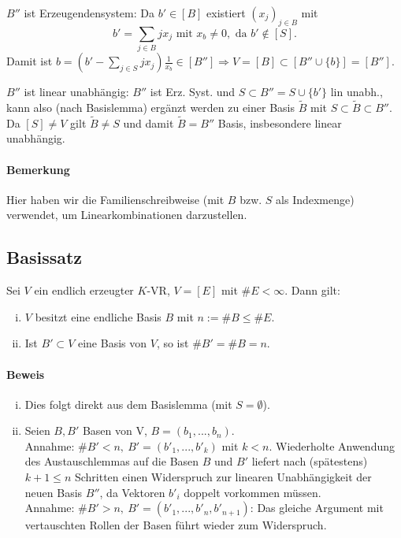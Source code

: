     $B''$ ist Erzeugendensystem: Da $b'\in [B]$ existiert $(x_j)_{j\in B}$ mit
    \[b' = \sum_{j\in B} jx_j \text{ mit } x_b \neq 0, \text{ da } b' \notin [S].\]
    Damit ist $b=(b'-\sum_{j\in S} jx_j)\frac{1}{x_b} \in [B''] \Rightarrow V = [B] \subset [B'' \cup \{b\}] =  [B'']$.
    
    $B''$ ist linear unabhängig: $B''$ ist Erz. Syst. und $S\subset B'' = S \cup \{b'\}$ lin unabh., kann also (nach Basislemma) ergänzt werden zu einer Basis $\tilde{B}$ mit $S\subset \tilde{B}\subset B''$.
    Da $[S] \neq V$ gilt $\tilde{B} \neq S$ und damit $\tilde{B} = B''$ Basis, insbesondere linear unabhängig.
    
\paragraph{Bemerkung}
    Hier haben wir die Familienschreibweise (mit $B$ bzw. $S$ als Indexmenge) verwendet, um Linearkombinationen darzustellen.
    
\subsection{Basissatz}
	\begin{Satz}[Basissatz]
	Sei $V$ ein endlich erzeugter $K$-VR, $V=[E]$ mit $\#E < \infty$. Dann gilt:
	\begin{enumerate}[(i)]
		\item $V$ besitzt eine endliche Basis $B$ mit $n:= \#B \leq \#E$.
		\item Ist $B'\subset V$ eine Basis von $V$, so ist $\#B' = \#B = n$.
	\end{enumerate}
	\end{Satz}
    
\paragraph{Beweis}
    \begin{enumerate}[(i)]
        \item  Dies folgt direkt aus dem Basislemma (mit $S=\emptyset$).
        \item Seien $B,B'$ Basen von V, $B = (b_1,...,b_n)$.\\
        Annahme: $\#B' < n,\ B' = (b'_1,...,b'_k)$ mit $k < n$. Wiederholte Anwendung des Austauschlemmas auf die Basen $B$ und $B'$ liefert nach (spätestens) $k+1\leq n$ Schritten einen Widerspruch zur linearen Unabhängigkeit der neuen Basis $B''$, da Vektoren $b'_i$ doppelt vorkommen müssen.\\
        Annahme: $\#B' > n,\ B' = (b'_1,...,b'_n,b'_{n+1})$: Das gleiche Argument mit vertauschten Rollen der Basen führt wieder zum Widerspruch.
     \end{enumerate}

